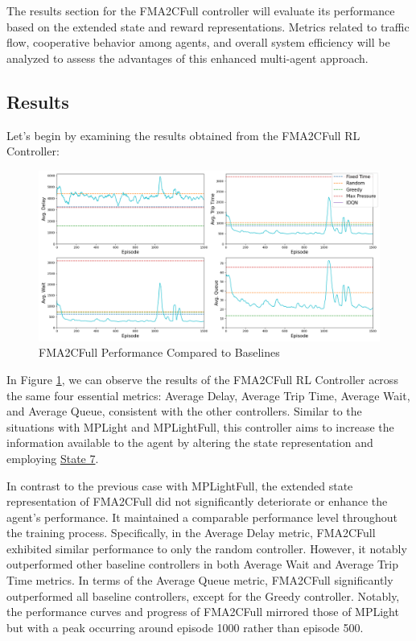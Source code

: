 The results section for the FMA2CFull controller will evaluate its performance based on the extended state and reward representations. Metrics related to traffic flow, cooperative behavior among agents, and overall system efficiency will be analyzed to assess the advantages of this enhanced multi-agent approach.

\subsection{Results}
Let's begin by examining the results obtained from the FMA2CFull RL Controller:

\begin{figure}[h]
    \centering
    \includegraphics[width=1\linewidth]{images/experiments/FMA2CFULL.png}
    \caption{FMA2CFull Performance Compared to Baselines}
    \label{fig:fama2cfull_results}
\end{figure}

In Figure \ref{fig:fama2cfull_results}, we can observe the results of the FMA2CFull RL Controller across the same four essential metrics: Average Delay, Average Trip Time, Average Wait, and Average Queue, consistent with the other controllers. Similar to the situations with MPLight and MPLightFull, this controller aims to increase the information available to the agent by altering the state representation and employing \hyperref[subsec:state-7]{State 7}.

In contrast to the previous case with MPLightFull, the extended state representation of FMA2CFull did not significantly deteriorate or enhance the agent's performance. It maintained a comparable performance level throughout the training process. Specifically, in the Average Delay metric, FMA2CFull exhibited similar performance to only the random controller. However, it notably outperformed other baseline controllers in both Average Wait and Average Trip Time metrics. In terms of the Average Queue metric, FMA2CFull significantly outperformed all baseline controllers, except for the Greedy controller. Notably, the performance curves and progress of FMA2CFull mirrored those of MPLight but with a peak occurring around episode 1000 rather than episode 500.

